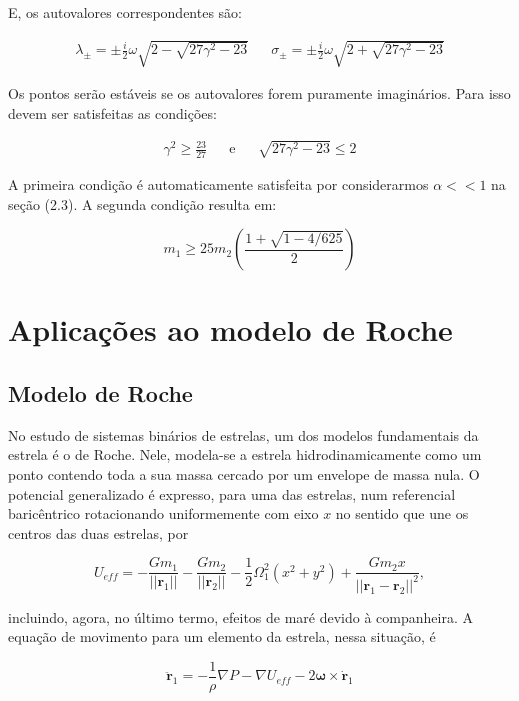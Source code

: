 E, os autovalores correspondentes são:

\begin{align}
\lambda_{\pm} = \pm \frac{i}{2} \omega \sqrt{2-\sqrt{27\gamma^2-23}} && \sigma_{\pm} = \pm \frac{i}{2} \omega \sqrt{2 +\sqrt{27\gamma^2 - 23}}
\end{align}

Os pontos serão estáveis se os autovalores forem puramente imaginários. Para isso devem ser satisfeitas as condições:

\begin{align}
\gamma^2 \geq \frac{23}{27} && \text{e} && \sqrt{27\gamma^2 -23} \leq 2
\end{align}

A primeira condição é automaticamente satisfeita por considerarmos $\alpha << 1$ na seção (2.3). A segunda condição resulta em:

\begin{equation}
m_1 \geq 25m_2\left(\dfrac{1+\sqrt{1-4/625}}{2}\right)
\end{equation}

\section{Aplicações ao modelo de Roche}

\subsection{Modelo de Roche}

No estudo de sistemas binários de estrelas, um dos modelos fundamentais da estrela é o de Roche. Nele, modela-se a estrela hidrodinamicamente como um ponto contendo toda a sua massa cercado por um envelope de massa nula. O potencial generalizado é expresso, para uma das estrelas, num referencial baricêntrico rotacionando uniformemente com eixo $x$ no sentido que une os centros das duas estrelas, por

\begin{equation}
    U_{eff} = -\frac{Gm_1}{||\mathbf{r}_1||}-\frac{Gm_2}{||\mathbf{r}_2||}-\frac{1}{2}\Omega_1^2(x^2 + y^2)+\frac{Gm_2x}{||\mathbf{r}_1 - \mathbf{r}_2||^2},
\end{equation}

incluindo, agora, no último termo, efeitos de maré devido à companheira. A equação de movimento para um elemento da estrela, nessa situação, é

\begin{equation}
    \label{eq:rochemotion}
    \ddot{\mathbf{r}}_1 = -\frac{1}{\rho}\nabla P - \nabla U_{eff} - 2\mathbf{\omega}\times\dot{\mathbf{r}}_1
\end{equation}

